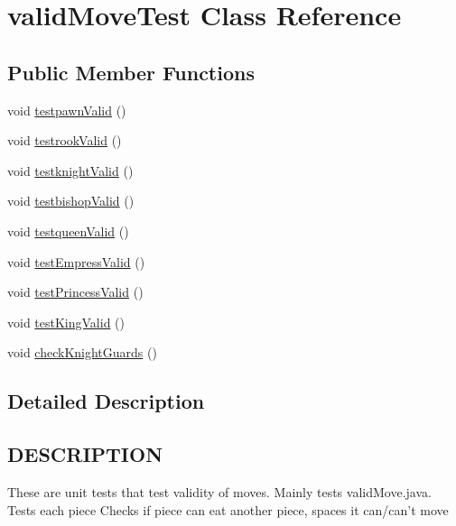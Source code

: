 \hypertarget{classvalidMoveTest}{\section{valid\-Move\-Test Class Reference}
\label{classvalidMoveTest}
}
\subsection*{Public Member Functions}
\begin{DoxyCompactItemize}
\item 
void \hyperlink{classvalidMoveTest_af883b5f90da3b98bfb9eb7ba27b90d75}{testpawn\-Valid} ()
\item 
void \hyperlink{classvalidMoveTest_a4494f774965708934097b0b4056e6393}{testrook\-Valid} ()
\item 
void \hyperlink{classvalidMoveTest_af6f87203255a747144b6cb6eb27ee710}{testknight\-Valid} ()
\item 
void \hyperlink{classvalidMoveTest_adbacd4c4c2e9b955d050575572ec6652}{testbishop\-Valid} ()
\item 
void \hyperlink{classvalidMoveTest_a2b876b08b07af952bdf35e881200f33b}{testqueen\-Valid} ()
\item 
void \hyperlink{classvalidMoveTest_a60468ae7602d73dc2545067d127655f5}{test\-Empress\-Valid} ()
\item 
void \hyperlink{classvalidMoveTest_aefe481cbdb041b958c7550198c9f38c4}{test\-Princess\-Valid} ()
\item 
void \hyperlink{classvalidMoveTest_ac72b70d56bfbb64c2720b94aa4523d94}{test\-King\-Valid} ()
\item 
void \hyperlink{classvalidMoveTest_a743597e2c3a39f1430eca98e48d6ff86}{check\-Knight\-Guards} ()
\end{DoxyCompactItemize}


\subsection{Detailed Description}
\hypertarget{classvalidMoveTest_DESCRIPTION}{}\subsection{D\-E\-S\-C\-R\-I\-P\-T\-I\-O\-N}\label{classvalidMoveTest_DESCRIPTION}
These are unit tests that test validity of moves. Mainly tests valid\-Move.\-java. Tests each piece Checks if piece can eat another piece, spaces it can/can't move 

